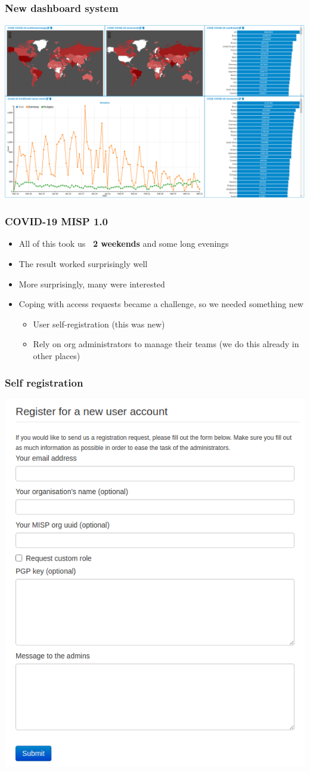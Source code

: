 \begin{frame}
 \frametitle{New dashboard system}
 \includegraphics[width=1.0\linewidth]{dashboard.png}
\end{frame}


\begin{frame}
 \frametitle{COVID-19 MISP 1.0}
 \begin{itemize}
         \item All of this took us {\bf ~2 weekends} and some long evenings
         \item The result worked surprisingly well
         \item More surprisingly, many were interested
         \item Coping with access requests became a challenge, so we needed something new
         \begin{itemize}
              \item User self-registration (this was new)
              \item Rely on org administrators to manage their teams (we do this already in other places)
         \end{itemize}
 \end{itemize}
\end{frame}

\begin{frame}
 \frametitle{Self registration}
 \includegraphics[width=0.6\linewidth]{registration.png}
\end{frame}

